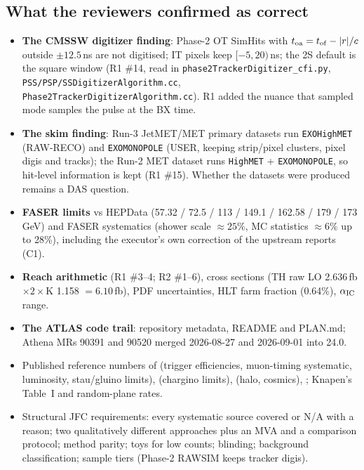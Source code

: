 \documentclass[11pt,a4paper]{article}
\begin{document}
\subsection{What the reviewers confirmed as correct}
\begin{good}
\begin{itemize}[leftmargin=1.2em]
\item \textbf{The CMSSW digitizer finding}: Phase-2 OT SimHits with $t_{\rm oa}=t_{\rm of}-|r|/c$ outside $\pm12.5$\,ns are not digitised; IT pixels keep $[-5,20)$\,ns; the 2S default is the square window (R1 \#14, read in \texttt{phase2TrackerDigitizer\_cfi.py}, \texttt{PSS/PSP/SSDigitizerAlgorithm.cc}, \texttt{Phase2TrackerDigitizerAlgorithm.cc}). R1 added the nuance that sampled mode samples the pulse at the BX time.
\item \textbf{The skim finding}: Run-3 JetMET/MET primary datasets run \texttt{EXOHighMET} (RAW-RECO) and \texttt{EXOMONOPOLE} (USER, keeping strip/pixel clusters, pixel digis and tracks); the Run-2 MET dataset runs \texttt{HighMET} + \texttt{EXOMONOPOLE}, so hit-level information is kept (R1 \#15). Whether the datasets were produced remains a DAS question.
\item \textbf{FASER limits} vs HEPData (57.32 / 72.5 / 113 / 149.1 / 162.58 / 179 / 173\,GeV) and FASER systematics (shower scale $\approx25\%$, MC statistics $\approx6\%$ up to 28\%), including the executor's own correction of the upstream reports (C1).
\item \textbf{Reach arithmetic} (R1 \#3--4; R2 \#1--6), cross sections (TH raw LO 2.636\,fb $\times2\times$K 1.158 $=6.10$\,fb), PDF uncertainties, HLT farm fraction (0.64\%), $\alpha_{\rm IC}$ range.
\item \textbf{The ATLAS code trail}: repository metadata, README and PLAN.md; Athena MRs 90391 and 90520 merged 2026-08-27 and 2026-09-01 into 24.0.
\item Published reference numbers of \cite{HSCP} (trigger efficiencies, muon-timing systematic, luminosity, stau/gluino limits), \cite{DT} (chargino limits), \cite{stopped} (halo, cosmics), \cite{L1DS}; Knapen's Table~I and random-plane rates.
\item Structural JFC requirements: every systematic source covered or N/A with a reason; two qualitatively different approaches plus an MVA and a comparison protocol; method parity; toys for low counts; blinding; background classification; sample tiers (Phase-2 RAWSIM keeps tracker digis).
\end{itemize}
\end{good}
\end{document}
